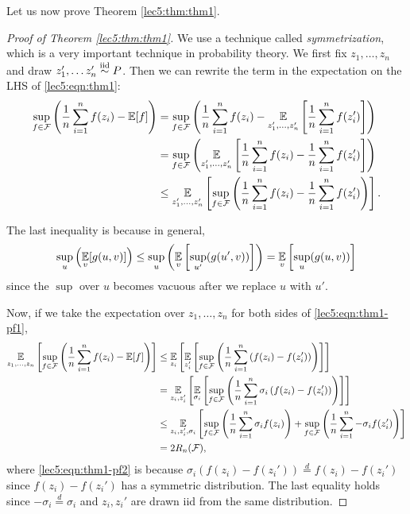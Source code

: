 Let us now prove Theorem \ref{lec5:thm:thm1}.

\begin{proof}[Proof of Theorem \ref{lec5:thm:thm1}]
We use a technique called \textit{symmetrization}, which is a very important technique in probability theory. We first fix $z_1, \dots, z_n$and draw $ z_1', \dots z_n' \overset{\textup{iid}}{\sim} P$. Then we can rewrite the term in the expectation on the LHS of \eqref{lec5:eqn:thm1}:
\begin{align}
    \sup_{f \in \mathcal F} \left( \frac{1}{n} \sum^n_{i=1} f(z_i) - \operatorname*{\mathbb{E}}[f] \right) &= \sup_{f \in \mathcal F} \left( \frac{1}{n} \sum^n_{i=1} f(z_i) - \operatorname*{\mathbb{E}}_{z_1',\dots, z_n'} \left[ \frac{1}{n} \sum^n_{i=1} f(z_i')\right] \right) \\
    &= \sup_{f \in \mathcal F} \left( \operatorname*{\mathbb{E}}_{z_1',\dots, z_n'} \left[\frac{1}{n} \sum^n_{i=1} f(z_i) -  \frac{1}{n} \sum^n_{i=1} f(z_i')\right] \right)\\
    &\leq \operatorname*{\mathbb{E}}_{z_1',\dots, z_n'} \left[\sup_{f \in \mathcal F} \left( \frac{1}{n} \sum^n_{i=1} f(z_i) -  \frac{1}{n} \sum^n_{i=1} f(z_i')\right)\right]. \label{lec5:eqn:thm1-pf1}
\end{align}

The last inequality is because in general,
\begin{align}
    \sup_u \left(\operatorname*{\mathbb{E}}_v[g(u,v)]\right) \leq \sup_u \left( \operatorname*{\mathbb{E}}_v\left[\sup_{u'}(g(u',v))\right]\right) = \operatorname*{\mathbb{E}}_v \left[\sup_u (g(u,v))\right]
\end{align}
since the $\sup$ over $u$ becomes vacuous after we replace $u$ with $u'$.

Now, if we take the expectation over $z_1, \dots, z_n$ for both sides of \eqref{lec5:eqn:thm1-pf1},
\begin{align}
    \operatorname*{\mathbb{E}}_{z_1, \dots, z_n} \left[\sup_{f \in \mathcal F} \left( \frac{1}{n} \sum^n_{i=1} f(z_i) - \operatorname*{\mathbb{E}}[f] \right) \right] 
    &\leq \operatorname*{\mathbb{E}}_{z_i} \left[ \operatorname*{\mathbb{E}}_{z_i'} \left[\sup_{f \in \mathcal F} \left( \frac{1}{n} \sum^n_{i=1} \left(f(z_i) -  f(z_i')\right)\right)\right]\right]\\
    &= \operatorname*{\mathbb{E}}_{z_i,z_i'} \left[ \operatorname*{\mathbb{E}}_{\sigma_i} \left[\sup_{f \in \mathcal F} \left( \frac{1}{n} \sum^n_{i=1} \sigma_i\left(f(z_i) -  f(z_i')\right)\right)\right]\right] \label{lec5:eqn:thm1-pf2} \\
 &\leq \operatorname*{\mathbb{E}}_{z_i,z_i', \sigma_i} \left[\sup_{f \in \mathcal F} \left( \frac{1}{n} \sum^n_{i=1} \sigma_i f(z_i)\right)+\sup_{f \in \mathcal F} \left( \frac{1}{n} \sum^n_{i=1} -\sigma_i f(z_i')\right)\right] \\
    &= 2R_n(\mathcal F),
\end{align}
where \eqref{lec5:eqn:thm1-pf2} is because $\sigma_i(f(z_i) - f(z_i')) \stackrel{d}{=} f(z_i) - f(z_i')$ since $f(z_i) - f(z_i')$ has a symmetric distribution. The last equality holds since $-\sigma_i \overset{d}{=} \sigma_i$ and $z_i, z_i'$ are drawn iid from the same distribution. 
\end{proof}

